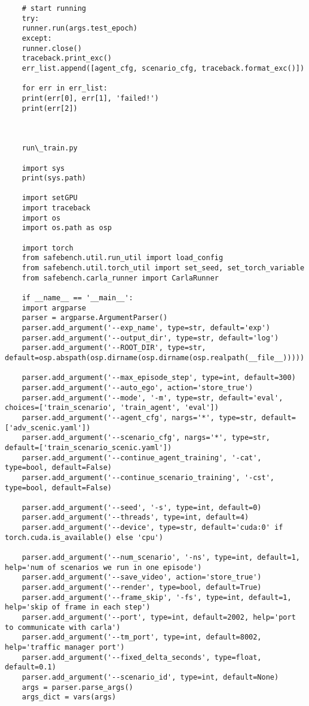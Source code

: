 \begin{lstlisting}
	# start running
	try:
	runner.run(args.test_epoch)
	except:
	runner.close()
	traceback.print_exc()
	err_list.append([agent_cfg, scenario_cfg, traceback.format_exc()])
	
	for err in err_list:
	print(err[0], err[1], 'failed!')
	print(err[2])
	
	
	
	run\_train.py
	
	import sys
	print(sys.path)
	
	import setGPU
	import traceback
	import os
	import os.path as osp
	
	import torch 
	from safebench.util.run_util import load_config
	from safebench.util.torch_util import set_seed, set_torch_variable
	from safebench.carla_runner import CarlaRunner
	
	if __name__ == '__main__':
	import argparse
	parser = argparse.ArgumentParser()
	parser.add_argument('--exp_name', type=str, default='exp')
	parser.add_argument('--output_dir', type=str, default='log')
	parser.add_argument('--ROOT_DIR', type=str, default=osp.abspath(osp.dirname(osp.dirname(osp.realpath(__file__)))))
	
	parser.add_argument('--max_episode_step', type=int, default=300)
	parser.add_argument('--auto_ego', action='store_true')
	parser.add_argument('--mode', '-m', type=str, default='eval', choices=['train_scenario', 'train_agent', 'eval'])
	parser.add_argument('--agent_cfg', nargs='*', type=str, default=['adv_scenic.yaml'])
	parser.add_argument('--scenario_cfg', nargs='*', type=str, default=['train_scenario_scenic.yaml'])
	parser.add_argument('--continue_agent_training', '-cat', type=bool, default=False)
	parser.add_argument('--continue_scenario_training', '-cst', type=bool, default=False)
	
	parser.add_argument('--seed', '-s', type=int, default=0)
	parser.add_argument('--threads', type=int, default=4)
	parser.add_argument('--device', type=str, default='cuda:0' if torch.cuda.is_available() else 'cpu')   
	
	parser.add_argument('--num_scenario', '-ns', type=int, default=1, help='num of scenarios we run in one episode')
	parser.add_argument('--save_video', action='store_true')
	parser.add_argument('--render', type=bool, default=True)
	parser.add_argument('--frame_skip', '-fs', type=int, default=1, help='skip of frame in each step')
	parser.add_argument('--port', type=int, default=2002, help='port to communicate with carla')
	parser.add_argument('--tm_port', type=int, default=8002, help='traffic manager port')
	parser.add_argument('--fixed_delta_seconds', type=float, default=0.1)
	parser.add_argument('--scenario_id', type=int, default=None)
	args = parser.parse_args()
	args_dict = vars(args)
	

\end{lstlisting}
